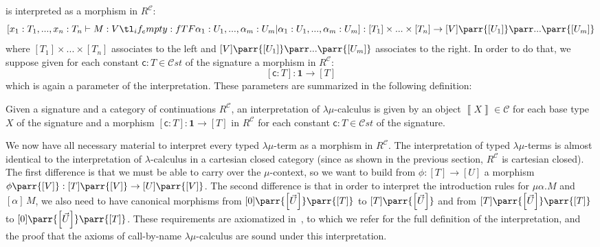 \documentclass{CSML}
\renewcommand{\ldots}{...}
\newcommand*\ifpresent[3]{\tl_if_empty:fTF{#1}{#3}{#2}}
\newcommand*\Entails{\mathrel{\vdash}}
\newcommand*\BarSep{\mathrel{|}}
\newcommand*\Sequent[3]{#1\Entails#2\ifpresent{#3}{\BarSep}{}#3}
\newcommand*\LmSortBot0
\newcommand*\LmSortBase{X}
\newcommand*\LmSortA{T}
\newcommand*\LmSortB{U}
\newcommand*\LmSortC{V}
\newcommand*\LmConsts{\mathcal{C}st}
\newcommand*\LmTerm[2]{#1\mathrel{:}#2}
\newcommand*\LmTermA{M}
\newcommand*\LmVarA{x}
\newcommand*\LmMVarA\alpha
\newcommand*\LmConst[1]{\mathsf{#1}}
\newcommand*\LmConstA{\LmConst{c}}
\newcommand*\CatC{\mathcal{C}}
\newcommand*\CatR{R}
\newcommand*\CatRC{\CatExp{\CatR}{\CatC}}
\newcommand*\CatTimes\times
\newcommand*\CatExp[2]{#1^{#2}}
\newcommand*\CatPar\parr
\newcommand*\CatRCHomA\phi
\newcommand*\CatTerm{\mathbf{1}}
\newcommand*\CatInterpSortNeg[1]{{\left\llbracket#1\right\rrbracket}}
\newcommand*\CatInterpSort[1]{{\left[#1\right]}}
\newcommand*\CatInterpTerm[1]{\left[#1\right]}
\begin{document}
is interpreted as a morphism in $\CatRC$:
$$\CatInterpTerm{\Sequent{\LmTerm{\LmVarA_1}{\LmSortA_1},\ldots,\LmTerm{\LmVarA_n}{\LmSortA_n}}{\LmTerm{\LmTermA}{\LmSortC}}{\LmTerm{\LmMVarA_1}{\LmSortB_1},\ldots,\LmTerm{\LmMVarA_m}{\LmSortB_m}}}:\CatInterpSort{\LmSortA_1}\CatTimes\ldots\CatTimes\CatInterpSort{\LmSortA_n}\to\CatInterpSort{\LmSortC}\CatPar\CatInterpSort{\LmSortB_1}\CatPar\ldots\CatPar\CatInterpSort{\LmSortB_m}$$
where $\CatInterpSort{\LmSortA_1}\CatTimes\ldots\CatTimes\CatInterpSort{\LmSortA_n}$ associates to the left and $\CatInterpSort{\LmSortC}\CatPar\CatInterpSort{\LmSortB_1}\CatPar\ldots\CatPar\CatInterpSort{\LmSortB_m}$ associates to the right. In order to do that, we suppose given for each constant $\LmTerm{\LmConstA}{\LmSortA}\in\LmConsts$ of the signature a morphism in $\CatRC$:
$$\CatInterpTerm{\LmTerm{\LmConstA}{\LmSortA}}:\CatTerm\to\CatInterpSort{\LmSortA}$$
which is again a parameter of the interpretation. These parameters are summarized in the following definition:
\begin{defi}[Interpretation]
Given a signature and a category of continuations $\CatRC$, an interpretation of $\lambda\mu$-calculus is given by an object $\CatInterpSortNeg{\LmSortBase}\in\CatC$ for each base type $\LmSortBase$ of the signature and a morphism $\CatInterpTerm{\LmTerm{\LmConstA}{\LmSortA}}:\CatTerm\to\CatInterpSort{\LmSortA}$ in $\CatRC$ for each constant $\LmTerm{\LmConstA}{\LmSortA}\in\LmConsts$ of the signature.
\end{defi}
We now have all necessary material to interpret every typed $\lambda\mu$-term as a morphism in $\CatRC$. The interpretation of typed $\lambda\mu$-terms is almost identical to the interpretation of $\lambda$-calculus in a cartesian closed category (since as shown in the previous section, $\CatRC$ is cartesian closed). The first difference is that we must be able to carry over the $\mu$-context, so we want to build from $\CatRCHomA:\CatInterpSort{\LmSortA}\to\CatInterpSort{\LmSortB}$ a morphism $\CatRCHomA\CatPar\CatInterpSort{\LmSortC}:\CatInterpSort{\LmSortA}\CatPar\CatInterpSort{\LmSortC}\to\CatInterpSort{\LmSortB}\CatPar\CatInterpSort{\LmSortC}$. The second difference is that in order to interpret the introduction rules for $\mu\LmMVarA.\LmTermA$ and $\left[\LmMVarA\right]\,\LmTermA$, we also need to have canonical morphisms from $\CatInterpSort{\LmSortBot}\CatPar\CatInterpSort{\vec{\LmSortB}}\CatPar\CatInterpSort{\LmSortA}$ to $\CatInterpSort{\LmSortA}\CatPar\CatInterpSort{\vec{\LmSortB}}$ and from $\CatInterpSort{\LmSortA}\CatPar\CatInterpSort{\vec{\LmSortB}}\CatPar\CatInterpSort{\LmSortA}$ to $\CatInterpSort{\LmSortBot}\CatPar\CatInterpSort{\vec{\LmSortB}}\CatPar\CatInterpSort{\LmSortA}$. These requirements are axiomatized in~\cite{SelingerControl}, to which we refer for the full definition of the interpretation, and the proof that the axioms of call-by-name $\lambda\mu$-calculus are sound under this interpretation.\par
\end{document}
